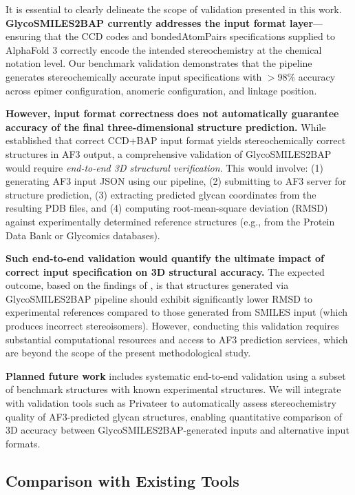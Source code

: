 \label{sec:validation_scope}

It is essential to clearly delineate the scope of validation presented in this work. \textbf{GlycoSMILES2BAP currently addresses the input format layer}---ensuring that the CCD codes and bondedAtomPairs specifications supplied to AlphaFold 3 correctly encode the intended stereochemistry at the chemical notation level. Our benchmark validation demonstrates that the pipeline generates stereochemically accurate input specifications with $>$98\% accuracy across epimer configuration, anomeric configuration, and linkage position.

\textbf{However, input format correctness does not automatically guarantee accuracy of the final three-dimensional structure prediction.} While \citet{huang2025} established that correct CCD+BAP input format yields stereochemically correct structures in AF3 output, a comprehensive validation of GlycoSMILES2BAP would require \textit{end-to-end 3D structural verification}. This would involve: (1) generating AF3 input JSON using our pipeline, (2) submitting to AF3 server for structure prediction, (3) extracting predicted glycan coordinates from the resulting PDB files, and (4) computing root-mean-square deviation (RMSD) against experimentally determined reference structures (e.g., from the Protein Data Bank or Glycomics databases).

\textbf{Such end-to-end validation would quantify the ultimate impact of correct input specification on 3D structural accuracy.} The expected outcome, based on the findings of \citet{huang2025}, is that structures generated via GlycoSMILES2BAP pipeline should exhibit significantly lower RMSD to experimental references compared to those generated from SMILES input (which produces incorrect stereoisomers). However, conducting this validation requires substantial computational resources and access to AF3 prediction services, which are beyond the scope of the present methodological study.

\textbf{Planned future work} includes systematic end-to-end validation using a subset of benchmark structures with known experimental structures. We will integrate with validation tools such as Privateer \citep{agirre2023} to automatically assess stereochemistry quality of AF3-predicted glycan structures, enabling quantitative comparison of 3D accuracy between GlycoSMILES2BAP-generated inputs and alternative input formats.

\subsection{Comparison with Existing Tools}

